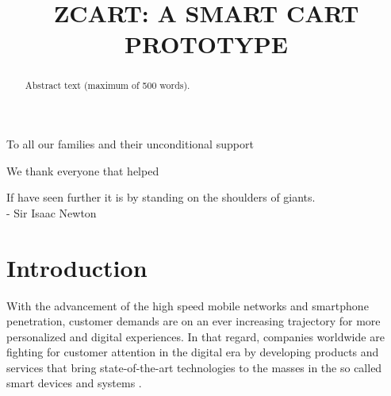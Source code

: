 \documentclass[openright]{normas-utf-tex} %
\title{\MakeUppercase{zCart: A smart cart prototype}} %
\begin{document}
\capa %
\folhaderosto %

\begin{dedicatoria}
    To all our families and their unconditional support
\end{dedicatoria}

\begin{agradecimentos}
    We thank everyone that helped
\end{agradecimentos}

\begin{epigrafe}
 If have seen further it is by standing on the shoulders of giants.  \\
- Sir Isaac Newton
\end{epigrafe}

\begin{abstract}
Abstract text (maximum of 500 words).
\end{abstract}

\listadefiguras %
\listadetabelas %
\listadesiglas %
\listadesimbolos %

\sumario %


%
%
%
%

\setcounter{page}{12}

\chapter{Introduction}

With the advancement of the high speed mobile networks and smartphone penetration,
customer demands are on an ever increasing trajectory for more personalized
and digital experiences. In that regard, companies worldwide are fighting for customer
attention in the digital era by developing products and services that bring state-of-the-art technologies
to the masses in the so called smart devices and systems \cite{Shafique2020}.
\end{document}
